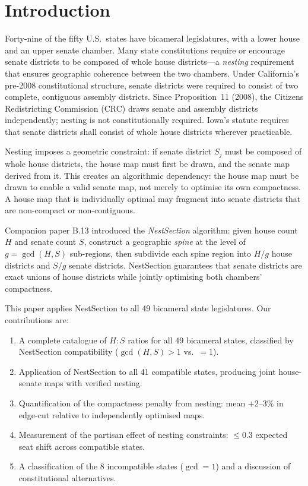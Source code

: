\section{Introduction}
\label{sec:intro}

Forty-nine of the fifty U.S.\ states have bicameral legislatures, with a lower
house and an upper senate chamber. Many state constitutions require or encourage
senate districts to be composed of whole house districts---a \emph{nesting}
requirement that ensures geographic coherence between the two chambers.
Under California's pre-2008 constitutional structure, senate districts were required
to consist of two complete, contiguous assembly districts.
Since Proposition~11 (2008), the Citizens Redistricting Commission (CRC) draws
senate and assembly districts independently; nesting is not constitutionally required.
Iowa's statute requires that senate districts shall consist of whole house
districts wherever practicable.

Nesting imposes a geometric constraint: if senate district $S_j$ must be
composed of whole house districts, the house map must first be drawn, and the
senate map derived from it. This creates an algorithmic dependency: the house
map must be drawn to enable a valid senate map, not merely to optimise its
own compactness. A house map that is individually optimal may fragment into
senate districts that are non-compact or non-contiguous.

Companion paper B.13 \citep{dellaLibera2026nestSection} introduced the
\emph{NestSection} algorithm: given house count $H$ and senate count $S$,
construct a geographic \emph{spine} at the level of $g = \gcd(H, S)$
sub-regions, then subdivide each spine region into $H/g$ house districts
and $S/g$ senate districts. NestSection guarantees that senate districts are
exact unions of house districts while jointly optimising both chambers' compactness.

This paper applies NestSection to all 49 bicameral state legislatures.
Our contributions are:
\begin{enumerate}
  \item A complete catalogue of $H:S$ ratios for all 49 bicameral states,
    classified by NestSection compatibility ($\gcd(H,S) > 1$ vs.\ $= 1$).
  \item Application of NestSection to all 41 compatible states, producing
    joint house-senate maps with verified nesting.
  \item Quantification of the compactness penalty from nesting: mean $+2$--$3\%$
    in edge-cut relative to independently optimised maps.
  \item Measurement of the partisan effect of nesting constraints: $\leq 0.3$
    expected seat shift across compatible states.
  \item A classification of the 8 incompatible states ($\gcd = 1$) and
    a discussion of constitutional alternatives.
\end{enumerate}

